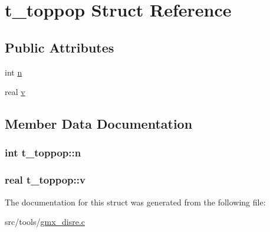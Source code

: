 \hypertarget{structt__toppop}{\section{t\-\_\-toppop \-Struct \-Reference}
\label{structt__toppop}
}
\subsection*{\-Public \-Attributes}
\begin{DoxyCompactItemize}
\item 
int \hyperlink{structt__toppop_a0092c0bd22c87d9627191964797bb998}{n}
\item 
real \hyperlink{structt__toppop_a252b7724f72be36dc7999df8398e9545}{v}
\end{DoxyCompactItemize}


\subsection{\-Member \-Data \-Documentation}
\hypertarget{structt__toppop_a0092c0bd22c87d9627191964797bb998}{
\subsubsection[{n}]{\setlength{\rightskip}{0pt plus 5cm}int {\bf t\-\_\-toppop\-::n}}}\label{structt__toppop_a0092c0bd22c87d9627191964797bb998}
\hypertarget{structt__toppop_a252b7724f72be36dc7999df8398e9545}{
\subsubsection[{v}]{\setlength{\rightskip}{0pt plus 5cm}real {\bf t\-\_\-toppop\-::v}}}\label{structt__toppop_a252b7724f72be36dc7999df8398e9545}


\-The documentation for this struct was generated from the following file\-:\begin{DoxyCompactItemize}
\item 
src/tools/\hyperlink{gmx__disre_8c}{gmx\-\_\-disre.\-c}\end{DoxyCompactItemize}
